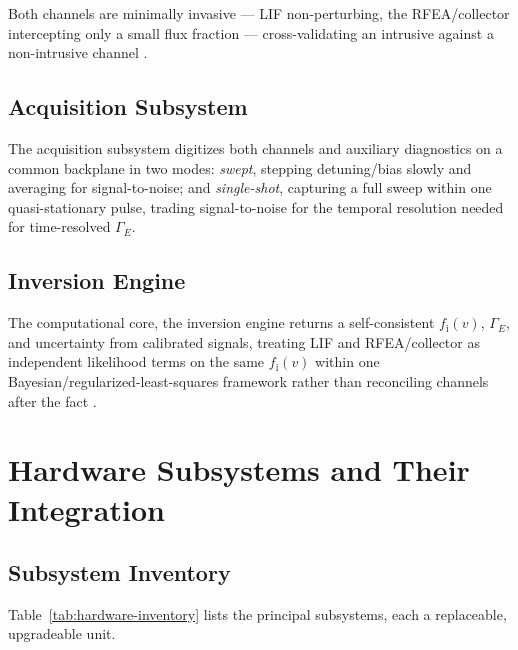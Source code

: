 Both channels are minimally invasive — LIF non-perturbing, the RFEA/collector intercepting only a small flux fraction — cross-validating an intrusive against a non-intrusive channel \cite{ref0490,ref0511,ref0496}.

\subsection{Acquisition Subsystem}
\label{sec:acquisition}

The acquisition subsystem digitizes both channels and auxiliary diagnostics on a common backplane in two modes: \emph{swept}, stepping detuning/bias slowly and averaging for signal-to-noise; and \emph{single-shot}, capturing a full sweep within one quasi-stationary pulse, trading signal-to-noise for the temporal resolution needed for time-resolved $\Gamma_{E}$.

\subsection{Inversion Engine}
\label{sec:inversion-engine-overview}

The computational core, the inversion engine returns a self-consistent $f_{\mathrm{i}}(v)$, $\Gamma_{E}$, and uncertainty from calibrated signals, treating LIF and RFEA/collector as independent likelihood terms on the same $f_{\mathrm{i}}(v)$ within one Bayesian/regularized-least-squares framework rather than reconciling channels after the fact \cite{ref0707,ref0710}.

\section{Hardware Subsystems and Their Integration}
\label{sec:hardware}

\subsection{Subsystem Inventory}

Table~\ref{tab:hardware-inventory} lists the principal subsystems, each a replaceable, upgradeable unit.

